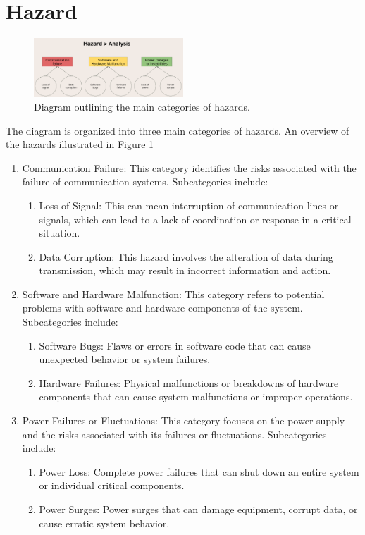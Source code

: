 \section{Hazard}
\label{sec:hazard} 

\begin{figure}[ht]
    \centering
    \includegraphics[width=0.5\textwidth]{images/hazard_analysis.png}
    \caption{Diagram outlining the main categories of hazards.}
    \label{fig:hazard_categories}
\end{figure}

The diagram is organized into three main categories of hazards. An overview of the hazards illustrated in Figure \ref{fig:hazard_categories}

\begin{enumerate}
    \item Communication Failure: This category identifies the risks associated with the failure of communication systems. Subcategories include:
    \begin{enumerate}
        \item Loss of Signal: This can mean interruption of communication lines or signals, which can lead to a lack of coordination or response in a critical situation.
        \item Data Corruption: This hazard involves the alteration of data during transmission, which may result in incorrect information and action.
    \end{enumerate}

    \item Software and Hardware Malfunction: This category refers to potential problems with software and hardware components of the system. Subcategories include:
    \begin{enumerate}
        \item Software Bugs: Flaws or errors in software code that can cause unexpected behavior or system failures.
        \item Hardware Failures: Physical malfunctions or breakdowns of hardware components that can cause system malfunctions or improper operations.
    \end{enumerate}

    \item Power Failures or Fluctuations: This category focuses on the power supply and the risks associated with its failures or fluctuations. Subcategories include:
    \begin{enumerate}
        \item Power Loss: Complete power failures that can shut down an entire system or individual critical components.
        \item Power Surges: Power surges that can damage equipment, corrupt data, or cause erratic system behavior.
    \end{enumerate}
\end{enumerate}

